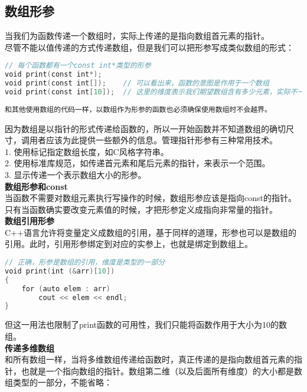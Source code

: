 \documentclass[
  a4paper,
  oneside,tablecaptionabove
]{scrbook}
\begin{document}
\subsection{数组形参}\label{ux6570ux7ec4ux5f62ux53c2}

当我们为函数传递一个数组时，实际上传递的是指向数组首元素的指针。\\
尽管不能以值传递的方式传递数组，但是我们可以把形参写成类似数组的形式：

\begin{lstlisting}[language={C++}]
// 每个函数都有一个const int*类型的形参
void print(const int*);
void print(const int[]);    // 可以看出来，函数的意图是作用于一个数组
void print(const int[10]);  // 这里的维度表示我们期望数组含有多少元素，实际不一定
\end{lstlisting}

\begin{lstlisting}
和其他使用数组的代码一样，以数组作为形参的函数也必须确保使用数组时不会越界。  
\end{lstlisting}

因为数组是以指针的形式传递给函数的，所以一开始函数并不知道数组的确切尺寸，调用者应该为此提供一些额外的信息。管理指针形参有三种常用技术。\\
1. 使用标记指定数组长度，如C风格字符串。\\
2. 使用标准库规范，如传递首元素和尾后元素的指针，来表示一个范围。\\
3. 显示传递一个表示数组大小的形参。\\
\textbf{数组形参和const}\\
当函数不需要对数组元素执行写操作的时候，数组形参应该是指向const的指针。只有当函数确实要改变元素值的时候，才把形参定义成指向非常量的指针。\\
\textbf{数组引用形参}\\
C++语言允许将变量定义成数组的引用，基于同样的道理，形参也可以是数组的引用。此时，引用形参绑定到对应的实参上，也就是绑定到数组上。

\begin{lstlisting}[language={C++}]
// 正确，形参是数组的引用，维度是类型的一部分
void print(int (&arr)[10])
{
    for (auto elem : arr)
        cout << elem << endl;
}
\end{lstlisting}

但这一用法也限制了print函数的可用性，我们只能将函数作用于大小为10的数组。\\
\textbf{传递多维数组}\\
和所有数组一样，当将多维数组传递给函数时，真正传递的是指向数组首元素的指针，也就是一个指向数组的指针。数组第二维（以及后面所有维度）的大小都是数组类型的一部分，不能省略：
\end{document}
